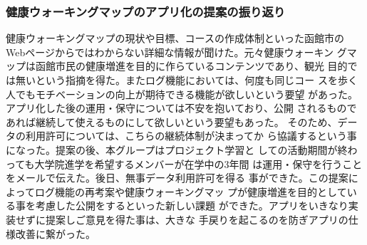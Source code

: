 ﻿\subsubsection{健康ウォーキングマップのアプリ化の提案の振り返り}
健康ウォーキングマップの現状や目標、コースの作成体制といった函館市の
Webページからではわからない詳細な情報が聞けた。元々健康ウォーキン
グマップは函館市民の健康増進を目的に作らているコンテンツであり、観光
目的では無いという指摘を得た。またログ機能においては、何度も同じコー
スを歩く人でもモチベーションの向上が期待できる機能が欲しいという要望
があった。アプリ化した後の運用・保守については不安を抱いており、公開
されるものであれば継続して使えるものにして欲しいという要望もあった。
そのため、データの利用許可については、こちらの継続体制が決まってか
ら協議するという事になった。提案の後、本グループはプロジェクト学習と
しての活動期間が終わっても大学院進学を希望するメンバーが在学中の3年間
は運用・保守を行うことをメールで伝えた。後日、無事データ利用許可を得る
事ができた。この提案によってログ機能の再考案や健康ウォーキングマッ
プが健康増進を目的としている事を考慮した公開をするといった新しい課題
ができた。アプリをいきなり実装せずに提案しご意見を得た事は、大きな
手戻りを起こるのを防ぎアプリの仕様改善に繋がった。


